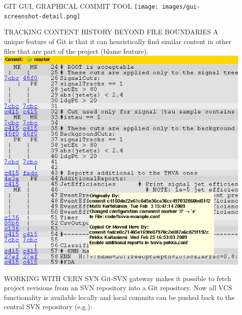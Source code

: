 \documentclass[final,hyperref={pdfpagelabels=false},notitlepage=true]{beamer}
\begin{document}
\begin{frame}{}
\begin{columns}[t]
\begin{column}{0.45\linewidth}
    \end{column}
      \begin{column}{0.45\linewidth}

    \vskip2cm
    \begin{block}{\large GIT GUI, GRAPHICAL COMMIT TOOL}
    \vskip1cm
      \texttt{[image: images/gui-screenshot-detail.png]}
    \end{block}

    \vskip2cm
    \begin{block}{\large TRACKING CONTENT HISTORY BEYOND FILE BOUNDARIES}
    \vskip1cm
      A unique
      feature of Git is that it can heuristically find similar
      content in other files that are part of the project (blame feature).
      \vskip1cm
      \includegraphics[width=1.0\linewidth]{images/git-gui-blame-content-copy-detection-detail.png}
    \end{block}

    \vskip2cm
	\begin{block}{\large WORKING WITH CERN SVN}
          \vskip1cm
          Git-SVN gateway makes it possible to fetch project revisions from an SVN repository into a Git 
          repository.
          \vskip1cm
          {\color{orange} Now all VCS functionality is available locally} and local commits can be pushed back to the central SVN repository (e.g.):


\end{block}
\end{column}
\end{columns}
\end{frame}
\end{document}
